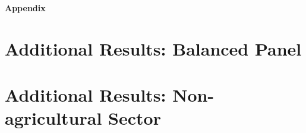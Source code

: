 \documentclass[12pt]{article}
\begin{document}
\newpage
% 


\newpage
\appendix
\onehalfspacing


\renewcommand\thefigure{\thesection.\arabic{figure}}
\setcounter{figure}{0}

\renewcommand\thetable{\thesection.\arabic{table}}
\setcounter{table}{0}
\begin{center}\textbf{\huge{Appendix}}\end{center}







\section{Additional Results: Balanced Panel}\label{app:balanced_panel}




\begin{landscape}
     
\end{landscape}
% 
% 
% 


\section{Additional Results: Non-agricultural Sector}\label{app:nonag}

\begin{landscape}
     
\end{landscape}



%      
% 
% 
% 
% 
\end{document}
